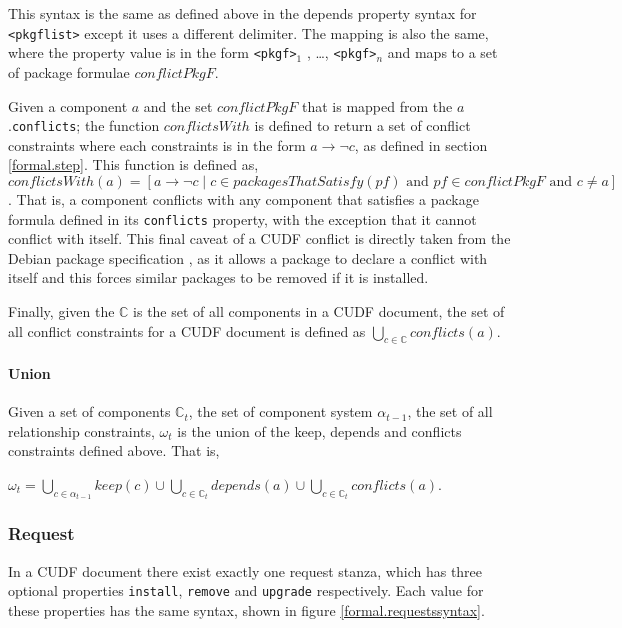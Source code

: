 This syntax is the same as defined above in the depends property syntax for \verb+<pkgflist>+ except it uses a different delimiter. 
The mapping is also the same, where the property value is in the form \verb+<pkgf>+$_1$ , \ldots , \verb+<pkgf>+$_n$ and maps to a set of package formulae $conflictPkgF$.

Given a component $a$ and the set $conflictPkgF$ that is mapped from the $a$.\verb+conflicts+;
the function $conflictsWith$ is defined to return a set of conflict constraints where each constraints is in the form $a \rightarrow \neg c$, as defined in section \ref{formal.step}.
This function is defined as, 
$conflictsWith(a) = [a \rightarrow \neg c \mid c \in packagesThatSatisfy(pf) \mbox{ and } pf \in conflictPkgF \mbox { and } c \not = a]$.
That is, a component conflicts with any component that satisfies a package formula defined in its \verb+conflicts+ property,
with the exception that it cannot conflict with itself.
This final caveat of a CUDF conflict is directly taken from the Debian package specification \citep{Barth2005}, 
as it allows a package to declare a conflict with itself and this forces similar packages to be removed if it is installed.  

Finally, given the $\mathbb{C}$ is the set of all components in a CUDF document,
the set of all conflict constraints for a CUDF document is defined as $\bigcup \limits_{c\in \mathbb{C}} conflicts(a)$.

\paragraph{Union}
Given a set of components $\mathbb{C}_t$, the set of component system $\alpha_{t-1}$, 
the set of all relationship constraints, $\omega_t$ is the union of the keep, depends and conflicts constraints defined above.
That is, 
\begin{defs}
$\omega_t = \bigcup \limits_{c \in \alpha_{t-1}} keep(c) \cup \bigcup \limits_{c \in \mathbb{C}_t} depends(a) \cup \bigcup \limits_{c\in \mathbb{C}_t} conflicts(a)$.
\end{defs}

\subsubsection{Request}
\label{formal.cudf.request}
In a CUDF document there exist exactly one request stanza, which has three optional properties \verb+install+, \verb+remove+ and \verb+upgrade+ respectively.
Each value for these properties has the same syntax, shown in figure \ref{formal.requestssyntax}.


